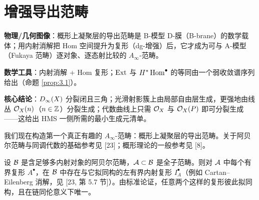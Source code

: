 
\section{增强导出范畴}
\label{sec:derived}


\begin{keytakeaways}
  \item \textbf{物理/几何图像}：概形上凝聚层的导出范畴是 B-模型 D-膜（B-brane）的数学载体；用内射消解把 Hom 空间提升为复形（dg-增强）后，它才成为可与 A-模型（Fukaya 范畴）逐对象、逐态射比较的 $A_\infty$-范畴。
  \item \textbf{数学工具}：内射消解 + Hom 复形；$\operatorname{Ext}$ 与 $H^*\operatorname{Hom}^\bullet$ 的等同由一个弱收敛谱序列给出（命题 \ref{prop:3.1}）。
  \item \textbf{核心结论}：$D_\infty(X)$ 分裂闭且三角；光滑射影簇上由局部自由层生成，更强地由线丛 $\mathcal{O}_X(n)$（$n\in\mathbb{Z}$）分裂生成；代数曲线上只需 $\mathcal{O}_X$ 与 $\mathcal{O}_X(P)$ 即可分裂生成——这给出 HMS 一侧所需的最小生成元清单。
\end{keytakeaways}

我们现在构造第一个真正有趣的 $A_\infty$-范畴：概形上凝聚层的导出范畴。关于阿贝尔范畴与同调代数的基础参考见 [23]；概形理论的一般参考见 [8]。

设 $\mathcal{B}$ 是含足够多内射对象的阿贝尔范畴，$\mathcal{A}\subset\mathcal{B}$ 是全子范畴。则对 $\mathcal{A}$ 中每个有界复形 $A^\bullet$，在 $\mathcal{B}$ 中存在与它拟同构的左有界内射复形 $I_A^\bullet$（例如 Cartan–Eilenberg 消解，见 [23, 第 5.7 节]）。由标准论证，任意两个这样的复形彼此拟同构，且在链同伦意义下唯一。


